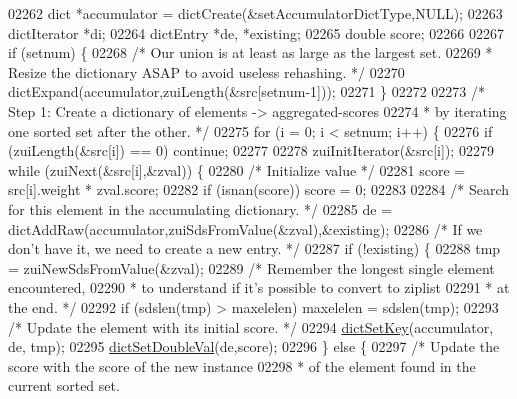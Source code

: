 \begin{DoxyCode}
02262         dict *accumulator = dictCreate(&setAccumulatorDictType,NULL);
02263         dictIterator *di;
02264         dictEntry *de, *existing;
02265         \textcolor{keywordtype}{double} score;
02266 
02267         \textcolor{keywordflow}{if} (setnum) \{
02268             \textcolor{comment}{/* Our union is at least as large as the largest set.}
02269 \textcolor{comment}{             * Resize the dictionary ASAP to avoid useless rehashing. */}
02270             dictExpand(accumulator,zuiLength(&src[setnum-1]));
02271         \}
02272 
02273         \textcolor{comment}{/* Step 1: Create a dictionary of elements -> aggregated-scores}
02274 \textcolor{comment}{         * by iterating one sorted set after the other. */}
02275         \textcolor{keywordflow}{for} (i = 0; i < setnum; i++) \{
02276             \textcolor{keywordflow}{if} (zuiLength(&src[i]) == 0) \textcolor{keywordflow}{continue};
02277 
02278             zuiInitIterator(&src[i]);
02279             \textcolor{keywordflow}{while} (zuiNext(&src[i],&zval)) \{
02280                 \textcolor{comment}{/* Initialize value */}
02281                 score = src[i].weight * zval.score;
02282                 \textcolor{keywordflow}{if} (isnan(score)) score = 0;
02283 
02284                 \textcolor{comment}{/* Search for this element in the accumulating dictionary. */}
02285                 de = dictAddRaw(accumulator,zuiSdsFromValue(&zval),&existing);
02286                 \textcolor{comment}{/* If we don't have it, we need to create a new entry. */}
02287                 \textcolor{keywordflow}{if} (!existing) \{
02288                     tmp = zuiNewSdsFromValue(&zval);
02289                     \textcolor{comment}{/* Remember the longest single element encountered,}
02290 \textcolor{comment}{                     * to understand if it's possible to convert to ziplist}
02291 \textcolor{comment}{                     * at the end. */}
02292                      \textcolor{keywordflow}{if} (sdslen(tmp) > maxelelen) maxelelen = sdslen(tmp);
02293                     \textcolor{comment}{/* Update the element with its initial score. */}
02294                     \hyperlink{dict_8h_a827e5dcfd37bba408fa8bdb111b0594e}{dictSetKey}(accumulator, de, tmp);
02295                     \hyperlink{dict_8h_aa0f8d86bdc0085ffb0d6345d9b92159d}{dictSetDoubleVal}(de,score);
02296                 \} \textcolor{keywordflow}{else} \{
02297                     \textcolor{comment}{/* Update the score with the score of the new instance}
02298 \textcolor{comment}{                     * of the element found in the current sorted set.}

\end{DoxyCode}
